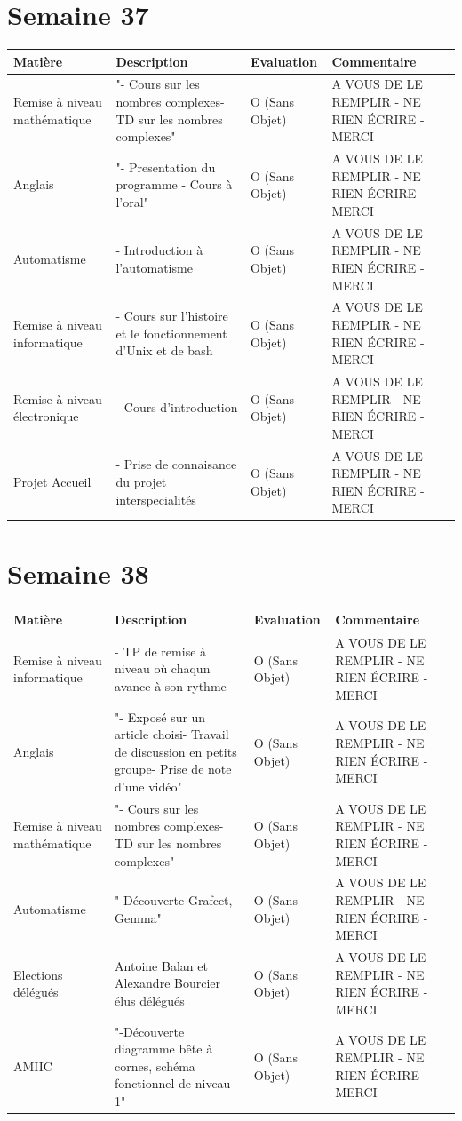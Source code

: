 \documentclass[12pt, openany]{report}
\begin{document}
\section*{Semaine 37}
\begin{tabular}{|l|l|l|l|}
\hline
Matière & Description & Evaluation & Commentaire \\ 
\hline
Remise à niveau mathématique & "- Cours sur les nombres complexes- TD sur les nombres complexes" & O (Sans Objet) & A VOUS DE LE REMPLIR - NE RIEN ÉCRIRE - MERCI \\ 
\hline
Anglais & "- Presentation du programme - Cours à l'oral" & O (Sans Objet) & A VOUS DE LE REMPLIR - NE RIEN ÉCRIRE - MERCI \\ 
\hline
Automatisme & - Introduction à l'automatisme & O (Sans Objet) & A VOUS DE LE REMPLIR - NE RIEN ÉCRIRE - MERCI \\ 
\hline
Remise à niveau informatique & - Cours sur l'histoire et le fonctionnement d'Unix et de bash & O (Sans Objet) & A VOUS DE LE REMPLIR - NE RIEN ÉCRIRE - MERCI \\ 
\hline
Remise à niveau électronique & - Cours d'introduction & O (Sans Objet) & A VOUS DE LE REMPLIR - NE RIEN ÉCRIRE - MERCI \\ 
\hline
Projet Accueil & - Prise de connaisance du projet interspecialités & O (Sans Objet) & A VOUS DE LE REMPLIR - NE RIEN ÉCRIRE - MERCI \\ 
\hline
\end{tabular}

\section*{Semaine 38}
\begin{tabular}{|l|l|l|l|}
\hline
Matière & Description & Evaluation & Commentaire \\ 
\hline
Remise à niveau informatique & - TP de remise à niveau où chaqun avance à son rythme & O (Sans Objet) & A VOUS DE LE REMPLIR - NE RIEN ÉCRIRE - MERCI \\ 
\hline
Anglais & "- Exposé sur un article choisi- Travail de discussion en petits groupe- Prise de note d'une vidéo" & O (Sans Objet) & A VOUS DE LE REMPLIR - NE RIEN ÉCRIRE - MERCI \\ 
\hline
Remise à niveau mathématique & "- Cours sur les nombres complexes- TD sur les nombres complexes" & O (Sans Objet) & A VOUS DE LE REMPLIR - NE RIEN ÉCRIRE - MERCI \\ 
\hline
Automatisme & "-Découverte Grafcet, Gemma" & O (Sans Objet) & A VOUS DE LE REMPLIR - NE RIEN ÉCRIRE - MERCI \\ 
\hline
Elections délégués & Antoine Balan et Alexandre Bourcier élus délégués & O (Sans Objet) & A VOUS DE LE REMPLIR - NE RIEN ÉCRIRE - MERCI \\ 
\hline
AMIIC & "-Découverte diagramme bête à cornes, schéma fonctionnel de niveau 1" & O (Sans Objet) & A VOUS DE LE REMPLIR - NE RIEN ÉCRIRE - MERCI \\ 
\hline
\end{tabular}
\end{document}

